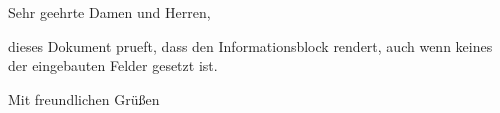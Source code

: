 \documentclass[infoblock, lang=german]{../../onlinebrief24}
\begin{document}
\begin{letter}{}
\opening{Sehr geehrte Damen und Herren,}

dieses Dokument prueft, dass \texttt{\string\addinfoblockrow} den
Informationsblock rendert, auch wenn keines der eingebauten Felder gesetzt ist.

\closing{Mit freundlichen Gr\"u\ss{}en}
\end{letter}
\end{document}
